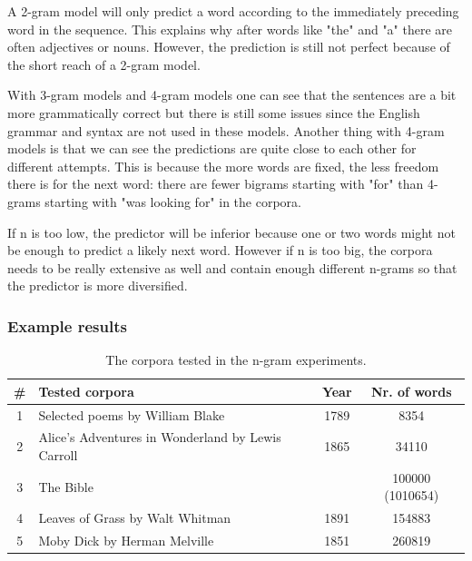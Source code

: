 \documentclass[a4paper,12pt]{article}
\begin{document}
A 2-gram model will only predict a word according to the immediately preceding word in the sequence. This explains why after words like "the" and "a" there are often adjectives or nouns. However, the prediction is still not perfect because of the short reach of a 2-gram model.

With 3-gram models and 4-gram models one can see that the sentences are a bit more grammatically correct but there is still some issues since the English grammar and syntax are not used in these models. Another thing with 4-gram models is that we can see the predictions are quite close to each other for different attempts. This is because the more words are fixed, the less freedom there is for the next word: there are fewer bigrams starting with "for" than 4-grams starting with "was looking for" in the corpora.
	
If n is too low, the predictor will be inferior because one or two words might not be enough to predict a likely next word. However if n is too big, the corpora needs to be really extensive as well and contain enough different n-grams so that the predictor is more diversified.

\subsubsection{Example results}
\begin{table}
\begin{center}
\begin{tabular}{|c|l|c|c|}
\hline
\# & Tested corpora & Year & Nr. of words\\ \hline
1 & Selected poems by William Blake & 1789 & 8354 \\ \hline
2 & Alice's Adventures in Wonderland by Lewis Carroll & 1865 & 34110 \\ \hline
3 & The Bible & & 100000 (1010654) \\ \hline
4 & Leaves of Grass by Walt Whitman & 1891 & 154883\\ \hline
5 & Moby Dick by Herman Melville & 1851 & 260819\\ \hline
\end{tabular}
\caption{The corpora tested in the n-gram experiments.}
\label{tab:corplist}
\end{center}
\end{table}
\end{document}
